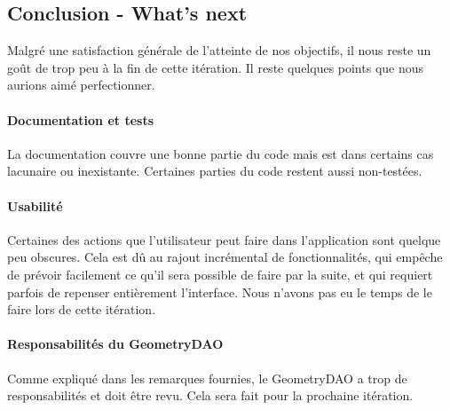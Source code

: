 \subsection{Conclusion - What's next}
Malgré une satisfaction générale de l'atteinte de nos objectifs, il nous reste 
un goût de trop peu à la fin de cette itération. Il reste quelques points que 
nous aurions aimé perfectionner.

	\paragraph{Documentation et tests} 
	La documentation couvre une bonne partie du code mais est dans certains cas 
	lacunaire ou inexistante. Certaines parties du code restent aussi non-testées.

	\paragraph{Usabilité} 
	Certaines des actions que l'utilisateur peut faire dans l'application sont
	quelque peu obscures. Cela est dû au rajout incrémental de fonctionnalités, 
	qui empêche de prévoir facilement ce qu'il sera possible de faire par la suite, 
	et qui requiert parfois de repenser entièrement l'interface. Nous n'avons
	pas eu le temps de le faire lors de cette itération.

	\paragraph{Responsabilités du GeometryDAO}
	Comme expliqué dans les remarques fournies, le GeometryDAO a trop de 
	responsabilités et doit être revu. Cela sera fait pour la prochaine 
	itération.

